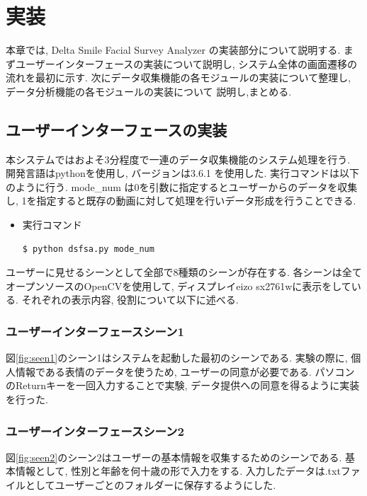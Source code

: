 \chapter{実装}
\label{chap:developing}
本章では, Delta Smile Facial Survey Analyzer の実装部分について説明する.
まずユーザーインターフェースの実装について説明し, システム全体の画面遷移の流れを最初に示す.
次にデータ収集機能の各モジュールの実装について整理し, データ分析機能の各モジュールの実装について
説明し,まとめる.

\section{ユーザーインターフェースの実装}
本システムではおよそ3分程度で一連のデータ収集機能のシステム処理を行う.
開発言語はpythonを使用し, バージョンは3.6.1 を使用した.
実行コマンドは以下のように行う. mode\_num は0を引数に指定するとユーザーからのデータを収集し,
1を指定すると既存の動画に対して処理を行いデータ形成を行うことできる.

\begin{itemize}
\item 実行コマンド
\begin{lstlisting}
$ python dsfsa.py mode_num
\end{lstlisting}
\end{itemize}

ユーザーに見せるシーンとして全部で8種類のシーンが存在する.
各シーンは全てオープンソースのOpenCVを使用して, ディスプレイeizo sx2761wに表示をしている.
それぞれの表示内容, 役割について以下に述べる.

\subsection{ユーザーインターフェースシーン1}
図\ref{fig:seen1}のシーン1はシステムを起動した最初のシーンである.
実験の際に, 個人情報である表情のデータを使うため, ユーザーの同意が必要である.
パソコンのReturnキーを一回入力することで実験, データ提供への同意を得るように実装を行った.

\subsection{ユーザーインターフェースシーン2}
図\ref{fig:seen2}のシーン2はユーザーの基本情報を収集するためのシーンである.
基本情報として, 性別と年齢を何十歳の形で入力をする.
入力したデータは.txtファイルとしてユーザーごとのフォルダーに保存するようにした.

